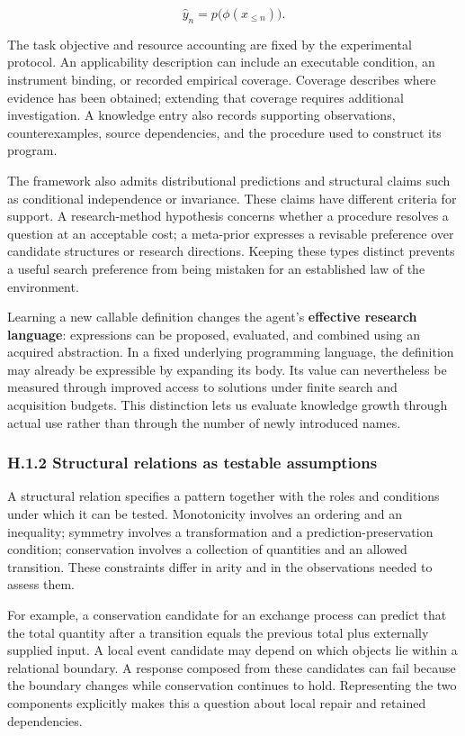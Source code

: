\documentclass[11pt,a4paper]{article}
\begin{document}
\[
\hat y_n=p\bigl(\phi(x_{\leq n})\bigr).
\]


The task objective and resource accounting are fixed by the experimental protocol. An applicability description can include an executable condition, an instrument binding, or recorded empirical coverage. Coverage describes where evidence has been obtained; extending that coverage requires additional investigation. A knowledge entry also records supporting observations, counterexamples, source dependencies, and the procedure used to construct its program.


The framework also admits distributional predictions and structural claims such as conditional independence or invariance. These claims have different criteria for support. A research-method hypothesis concerns whether a procedure resolves a question at an acceptable cost; a meta-prior expresses a revisable preference over candidate structures or research directions. Keeping these types distinct prevents a useful search preference from being mistaken for an established law of the environment.


Learning a new callable definition changes the agent's \textbf{effective research language}: expressions can be proposed, evaluated, and combined using an acquired abstraction. In a fixed underlying programming language, the definition may already be expressible by expanding its body. Its value can nevertheless be measured through improved access to solutions under finite search and acquisition budgets. This distinction lets us evaluate knowledge growth through actual use rather than through the number of newly introduced names.


\subsubsection*{H.1.2 Structural relations as testable assumptions}

A structural relation specifies a pattern together with the roles and conditions under which it can be tested. Monotonicity involves an ordering and an inequality; symmetry involves a transformation and a prediction-preservation condition; conservation involves a collection of quantities and an allowed transition. These constraints differ in arity and in the observations needed to assess them.


For example, a conservation candidate for an exchange process can predict that the total quantity after a transition equals the previous total plus externally supplied input. A local event candidate may depend on which objects lie within a relational boundary. A response composed from these candidates can fail because the boundary changes while conservation continues to hold. Representing the two components explicitly makes this a question about local repair and retained dependencies.
\end{document}
